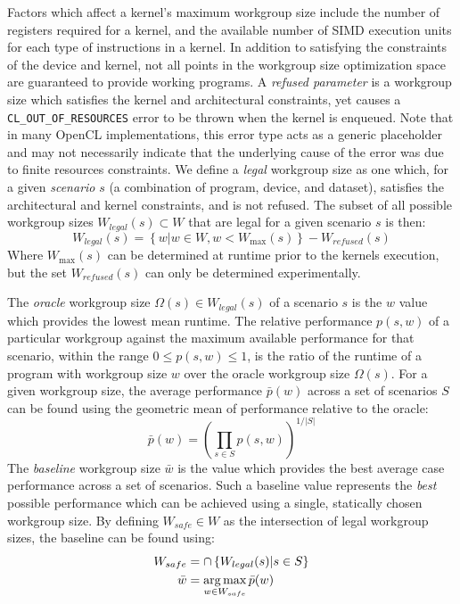 Factors which affect a kernel's maximum workgroup size include the
number of registers required for a kernel, and the available number of
SIMD execution units for each type of instructions in a kernel. In
addition to satisfying the constraints of the device and kernel, not
all points in the workgroup size optimization space are guaranteed to
provide working programs. A \emph{refused parameter} is a workgroup
size which satisfies the kernel and architectural constraints, yet
causes a \texttt{CL\_OUT\_OF\_RESOURCES} error to be thrown when the
kernel is enqueued. Note that in many OpenCL implementations, this
error type acts as a generic placeholder and may not necessarily
indicate that the underlying cause of the error was due to finite
resources constraints. We define a \emph{legal} workgroup size as one
which, for a given \emph{scenario} $s$ (a combination of program,
device, and dataset), satisfies the architectural and kernel
constraints, and is not refused. The subset of all possible workgroup
sizes $W_{legal}(s) \subset W$ that are legal for a given scenario $s$
is then:
%
\begin{equation}
  W_{legal}(s) = \left\{w | w \in W, w < W_{\max}(s) \right\} - W_{refused}(s)
\end{equation}
%
Where $W_{\max}(s)$ can be determined at runtime prior to the kernels
execution, but the set $W_{refused}(s)$ can only be determined
experimentally.

The \emph{oracle} workgroup size $\Omega(s) \in W_{legal}(s)$ of a
scenario $s$ is the $w$ value which provides the lowest mean
runtime. The relative performance $p(s,w)$ of a particular workgroup
against the maximum available performance for that scenario, within
the range $0 \le p(s,w) \le 1$, is the ratio of the runtime of a
program with workgroup size $w$ over the oracle workgroup size
$\Omega(s)$. For a given workgroup size, the average performance
$\bar{p}(w)$ across a set of scenarios $S$ can be found using the
geometric mean of performance relative to the oracle:
%
\begin{equation}
  \bar{p}(w) =
  \left(
    \prod_{s \in S} p(s, w)
  \right)^{1/|S|}
\end{equation}
%
The \emph{baseline} workgroup size $\bar{w}$ is the value which
provides the best average case performance across a set of
scenarios. Such a baseline value represents the \emph{best} possible
performance which can be achieved using a single, statically chosen
workgroup size. By defining $W_{safe} \in W$ as the intersection of
legal workgroup sizes, the baseline can be found using:
%
\begin{align}
W_{safe} &= \cap \left\{ W_{legal}(s) | s \in S \right\}\\
\bar{w} &= \operatorname*{arg\,max}_{w \in W_{safe}} \bar{p}(w)
\end{align}


